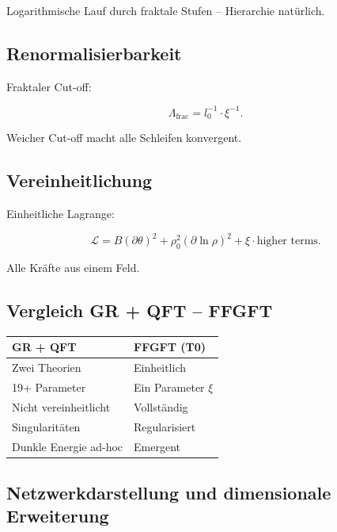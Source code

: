 	Logarithmische Lauf durch fraktale Stufen – Hierarchie natürlich.
	
	\subsection*{Renormalisierbarkeit}
	
	Fraktaler Cut-off:
	
	\begin{equation}
		\Lambda_{\text{frac}} = l_0^{-1} \cdot \xi^{-1}.
	\end{equation}
	
	Weicher Cut-off macht alle Schleifen konvergent.
	
	\subsection*{Vereinheitlichung}
	
	Einheitliche Lagrange:
	
	\begin{equation}
		\mathcal{L} = B (\partial \theta)^2 + \rho_0^2 (\partial \ln \rho)^2 + \xi \cdot \text{higher terms}.
	\end{equation}
	
	Alle Kräfte aus einem Feld.
	
	\subsection*{Vergleich GR + QFT – FFGFT}
	
	\begin{center}
		\begin{tabular}{p{}p{}}
			\textbf{GR + QFT} & \textbf{FFGFT (T0)} \\
			\hline
			Zwei Theorien & Einheitlich \\
			19+ Parameter & Ein Parameter \(\xi\) \\
			Nicht vereinheitlicht & Vollständig \\
			Singularitäten & Regularisiert \\
			Dunkle Energie ad-hoc & Emergent \\
		\end{tabular}
	\end{center}
	
	\subsection*{Netzwerkdarstellung und dimensionale Erweiterung}
	

